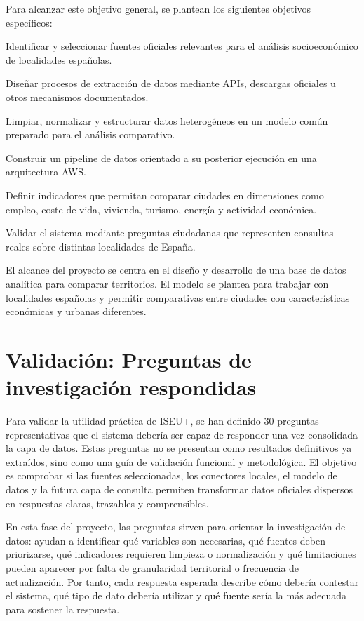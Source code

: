 Para alcanzar este objetivo general, se plantean los siguientes objetivos específicos:

Identificar y seleccionar fuentes oficiales relevantes para el análisis socioeconómico de localidades españolas.

Diseñar procesos de extracción de datos mediante APIs, descargas oficiales u otros mecanismos documentados.

Limpiar, normalizar y estructurar datos heterogéneos en un modelo común preparado para el análisis comparativo.

Construir un pipeline de datos orientado a su posterior ejecución en una arquitectura AWS.

Definir indicadores que permitan comparar ciudades en dimensiones como empleo, coste de vida, vivienda, turismo, energía y actividad económica.

Validar el sistema mediante preguntas ciudadanas que representen consultas reales sobre distintas localidades de España.

El alcance del proyecto se centra en el diseño y desarrollo de una base de datos analítica para comparar territorios. El modelo se plantea para trabajar con localidades españolas y permitir comparativas entre ciudades con características económicas y urbanas diferentes.

\section{Validación: Preguntas de investigación respondidas}

Para validar la utilidad práctica de ISEU+, se han definido 30 preguntas representativas que el sistema debería ser capaz de responder una vez consolidada la capa de datos. Estas preguntas no se presentan como resultados definitivos ya extraídos, sino como una guía de validación funcional y metodológica. El objetivo es comprobar si las fuentes seleccionadas, los conectores locales, el modelo de datos y la futura capa de consulta permiten transformar datos oficiales dispersos en respuestas claras, trazables y comprensibles.

En esta fase del proyecto, las preguntas sirven para orientar la investigación de datos: ayudan a identificar qué variables son necesarias, qué fuentes deben priorizarse, qué indicadores requieren limpieza o normalización y qué limitaciones pueden aparecer por falta de granularidad territorial o frecuencia de actualización. Por tanto, cada respuesta esperada describe cómo debería contestar el sistema, qué tipo de dato debería utilizar y qué fuente sería la más adecuada para sostener la respuesta.

